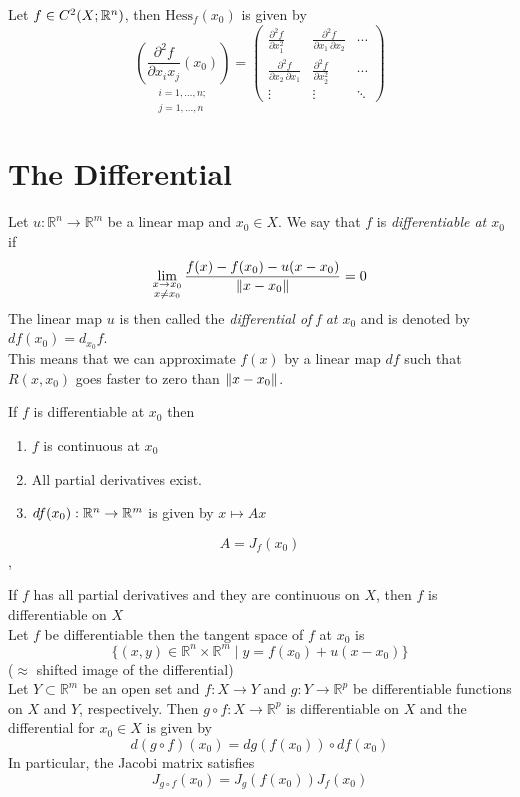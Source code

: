  Let $f \in C^2(X;\mathbb{R}^n)$, then $\text{Hess}_f(x_0)$ is given by
$$
 \underset{\substack{ i= 1,\dots,n;\\ j=1,\dots,n}}{\left(\frac{\partial ^{2}f}{\partial x_{i} x_j}\left(x_0\right)\right)} =
\begin{pmatrix}{\frac {\partial ^{2}f}{\partial x_{1}^{2}}}&{\frac {\partial ^{2}f}{\partial x_{1}\,\partial x_{2}}}&\cdots
\\[2.2ex]{\frac {\partial ^{2}f}{\partial x_{2}\,\partial x_{1}}}&{\frac {\partial ^{2}f}{\partial x_{2}^{2}}}&\cdots 
\\[2.2ex]\vdots &\vdots &\ddots  \end{pmatrix}
$$


\section{The Differential}

\Def[Differentiability] Let $u\colon \mathbb{R}^n\to\mathbb{R}^m$ be a linear map and $x_0\in X$. We say that $f$ is \textit{differentiable at $x_0$} if
$$
    \lim_{\substack{x\to x_0\\x\neq x_0}}\frac{f(x)-f(x_0)-u(x-x_0)}{\left\lVert x-x_0 \right\rVert} = 0
$$
The linear map $u$ is then called the \textit{differential of f at $x_0$} and is denoted by $df(x_0) = d_{x_0}f$.\\
\Intuition This means that we can approximate $f(x)$ by a linear map $df$ such that $R(x,x_0)$ goes faster to zero than $\left\lVert x-x_0 \right\rVert$.


\Theorem If $f$ is differentiable at $x_0$ then
\begin{enumerate}
	\item $f$ is continuous at $x_0$
	\item All partial derivatives exist.
	\item $df(x_0): \mathbb{R}^n \rightarrow \mathbb{R}^m$ is given by $x \mapsto Ax$
\end{enumerate}
$$A=J_f(x_0)$$
\sep

 If $f$ has all partial derivatives and they are continuous on $X$, then $f$ is differentiable on $X$ \\

 Let $f$ be differentiable then the tangent space of $f$ at $x_0$ is
$$\{(x,y)\in\mathbb{R}^n\times\mathbb{R}^m\mid y = f(x_0)+u(x-x_0)\} $$
($\approx$ shifted image of the differential) \\

 Let $Y\subset\mathbb{R}^m$ be an open set and $f\colon X \to Y$ and $g\colon Y \to \mathbb{R}^p$ be differentiable functions on $X$ and $Y$, respectively. Then $g\circ f\colon X \to \mathbb{R}^p$ is differentiable on $X$ and the differential for  $x_0\in X$ is given by 
$$
    d(g\circ f)(x_0) = dg(f(x_0))\circ df(x_0)
$$
In particular, the Jacobi matrix satisfies
$$
    J_{g\circ f}(x_0) = J_g(f(x_0)) J_f(x_0)
$$

